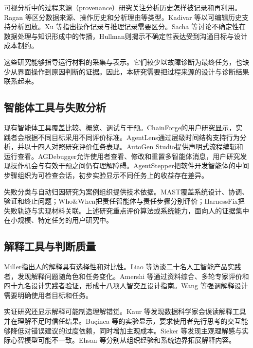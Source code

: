 可视分析中的过程来源（provenance）研究关注分析历史怎样被记录和再利用。Ragan 等\cite{ref36}区分数据来源、操作历史和分析理由等类型。Kadivar 等\cite{ref38}以可编辑历史支持分析回放。Xu 等\cite{ref37}指出操作记录与推理记录需要区分。Sacha 等\cite{ref39}讨论不确定性在数据处理与知识形成中的传播，Hullman\cite{ref40}则揭示不确定性表达受到沟通目标与设计成本制约。

这些研究能够指导运行材料的采集与表示。它们较少以故障诊断为最终任务，也缺少从界面操作到原因判断的证据。因此，本研究需要把过程来源的设计与诊断结果联系起来。

\subsection{智能体工具与失败分析}

现有智能体工具覆盖比较、概览、调试与干预。ChainForge\cite{arawjo2024chainforge}的用户研究显示，实践者会根据不同目标采用不同评价标准。AgentLens\cite{ref22}通过层级时间结构支持行为分析，并以十四人对照研究评价任务表现。AutoGen Studio\cite{ref25}提供声明式流程编辑和运行查看。AGDebugger\cite{ref02}允许使用者查看、修改和重置多智能体消息，用户研究发现操作机会与有效干预之间仍有理解障碍。AgentStepper\cite{ref18}把软件开发智能体的中间步骤组织为可检查会话，初步实验显示不同任务上的收益存在差异。

失败分类与自动归因研究为案例组织提供技术依据。MAST\cite{cemri2025mast}覆盖系统设计、协调、验证和终止问题；Who\&When\cite{ref03}把责任智能体与责任步骤分别评价；HarnessFix\cite{ref20}把失败轨迹与实现材料关联。上述研究重点评价算法或系统能力，面向人的证据集中在小规模、特定任务的用户研究中。

\subsection{解释工具与判断质量}

Miller\cite{ref47}指出人的解释具有选择性和对比性。Liao 等\cite{ref49}访谈二十名人工智能产品实践者，发现解释问题随角色和任务变化。Amershi 等\cite{ref48}通过资料综合、多轮专家评价和四十九名设计实践者验证，形成十八项人智交互设计指南。Wang 等\cite{ref53}强调解释设计需要明确使用者目标和任务。

实证研究还显示解释可能制造理解错觉。Kaur 等\cite{ref50}发现数据科学家会误读解释工具并在理解不足时信任结果。Buçinca 等\cite{ref55}的实验显示，要求使用者先行思考的交互能够降低对错误建议的过度依赖，同时增加主观成本。Sieker 等\cite{ref56}发现主观理解感与实际心智模型可能不一致。Ehsan 等\cite{ref51}\cite{ref54}分别从组织经验和系统边界拓展解释内容。


